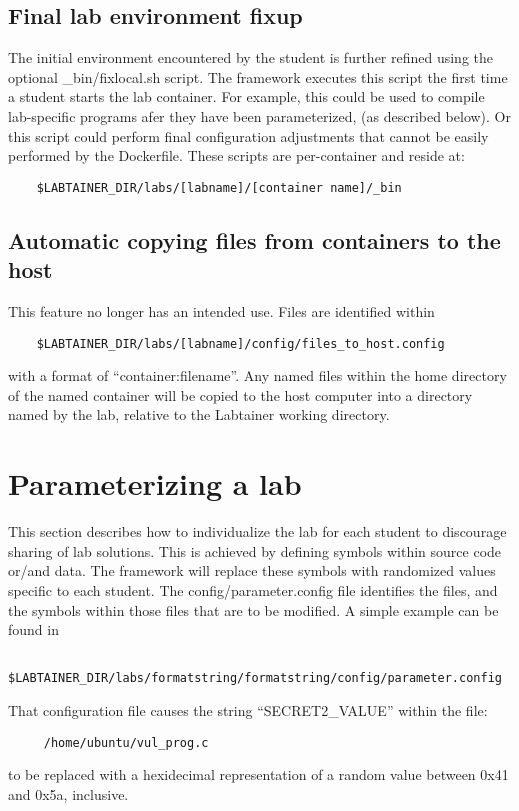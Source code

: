 \documentclass[12pt]{article}
\begin{document}
\subsection{Final lab environment fixup}
The initial environment encountered by the student is further refined using
the optional \_bin/fixlocal.sh script.  The framework executes
this script the first time a student starts the lab container.  For example,
this could be used to compile lab-specific programs afer they have been parameterized,
(as described below).  Or this script could perform final configuration adjustments
that cannot be easily performed by the Dockerfile.  These scripts are per-container
and reside at:
\begin{verbatim}
    $LABTAINER_DIR/labs/[labname]/[container name]/_bin
\end{verbatim}

\subsection{Automatic copying files from containers to the host}
This feature no longer has an intended use. 
Files are identified within
\begin{verbatim}
    $LABTAINER_DIR/labs/[labname]/config/files_to_host.config
\end{verbatim}
\noindent with a format of ``container:filename''.  Any named files within the home directory of
the named container will be copied to the host computer into a directory named by the lab, relative
to the Labtainer working directory.

\section{Parameterizing a lab}
This section describes how to individualize the lab for each student to discourage
sharing of lab solutions.  This is achieved by defining symbols within source 
code or/and data.  The framework will replace these symbols with randomized values
specific to each student.  The config/parameter.config file identifies the files, and
the symbols within those files that are to be modified.  A simple example can be found in 
\begin{verbatim}
    $LABTAINER_DIR/labs/formatstring/formatstring/config/parameter.config
\end{verbatim}

That configuration file causes the string ``SECRET2\_VALUE'' within the file:
\begin{verbatim}
     /home/ubuntu/vul_prog.c
\end{verbatim}
to be replaced with a hexidecimal representation of a random value
between 0x41 and 0x5a, inclusive.
\end{document}

